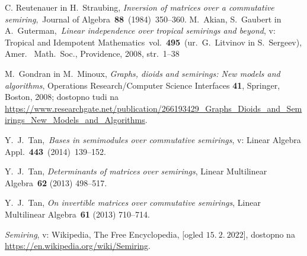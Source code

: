 \documentclass[mat1]{fmfdelo}
\begin{document}
\begin{thebibliography}{99}
	 C. Reutenauer in H.~Straubing, \emph{Inversion of matrices over a commutative semiring},~Journal of Algebra~\textbf{88}~(1984)~350--360.	
	 M.~Akian, S.~Gaubert in A.~Guterman,~\emph{Linear independence over tropical semirings and beyond}, v: Tropical and Idempotent Mathematics~vol.~\textbf{495}~(ur.\ G.~Litvinov in S.~Sergeev), Amer. \ Math.\ Soc., Providence, 2008, str.\ 1--38
	
	 M.~Gondran in M.~Minoux, \emph{Graphs, dioids and semirings: New models and algorithms}, Operations Research/Computer Science Interfaces \textbf{41}, Springer, Boston, 2008; dostopno tudi na \url{https://www.researchgate.net/publication/266193429_Graphs_Dioids_and_Semirings_New_Models_and_Algorithms}.
	

	 Y.\ J.\ Tan,~\emph{Bases in semimodules over commutative semirings}, v: Linear Algebra Appl.~\textbf{443}~(2014)~139--152.
	
	 Y.\ J.\ Tan, \emph{Determinants of matrices over semirings}, Linear Multilinear Algebra~\textbf{62} (2013) 498--517.
	
	 Y.\ J.\ Tan, \emph{On invertible matrices over commutative semirings}, Linear Multilinear Algebra~\textbf{61} (2013) 710--714.
	
	 \emph{Semiring}, v: Wikipedia, The Free Encyclopedia, [ogled $15.~2.~2022$], dostopno na \url{https://en.wikipedia.org/wiki/Semiring}.
	
\end{thebibliography}
\end{document}
